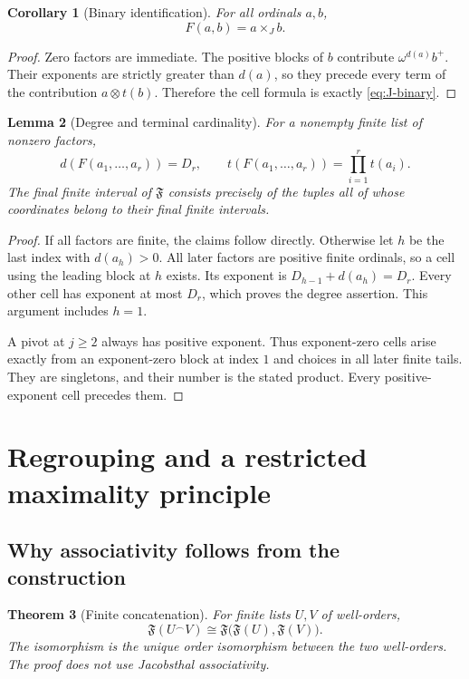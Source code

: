 \documentclass[11pt,letterpaper]{article}
\newtheorem{theorem}{Theorem}[section]
\newtheorem{lemma}[theorem]{Lemma}
\newtheorem{corollary}[theorem]{Corollary}
\theoremstyle{definition}
\theoremstyle{remark}
\newcommand{\J}{\mathbin{\times_{\!J}}}
\newcommand{\FF}{\mathfrak F}
\newcommand{\concat}{\mathbin{{}^{\frown}}}
\begin{document}
\begin{corollary}[Binary identification]\label{cor:F-binary}
For all ordinals $a,b$,
\[
 F(a,b)=a\J b.
\]
\end{corollary}

\begin{proof}
Zero factors are immediate. The positive blocks of $b$ contribute
$\omega^{d(a)}b^+$. Their exponents are strictly greater than $d(a)$, so
they precede every term of the contribution $a\otimes t(b)$. Therefore
the cell formula is exactly \eqref{eq:J-binary}.
\end{proof}

\begin{lemma}[Degree and terminal cardinality]\label{lem:metadata}
For a nonempty finite list of nonzero factors,
\begin{equation}\label{eq:metadata}
 d(F(a_1,\ldots,a_r))=D_r,
 \qquad t(F(a_1,\ldots,a_r))=\prod_{i=1}^{r}t(a_i).
\end{equation}
The final finite interval of $\FF$ consists precisely of the tuples all
of whose coordinates belong to their final finite intervals.
\end{lemma}

\begin{proof}
If all factors are finite, the claims follow directly. Otherwise let $h$
be the last index with $d(a_h)>0$. All later factors are positive finite
ordinals, so a cell using the leading block at $h$ exists. Its exponent
is $D_{h-1}+d(a_h)=D_r$. Every other cell has exponent at most $D_r$,
which proves the degree assertion. This argument includes $h=1$.

A pivot at $j\geq2$ always has positive exponent. Thus exponent-zero cells
arise exactly from an exponent-zero block at index $1$ and choices in all
later finite tails. They are singletons, and their number is the stated
product. Every positive-exponent cell precedes them.
\end{proof}

\section{Regrouping and a restricted maximality principle}\label{sec:grouping}

\subsection{Why associativity follows from the construction}

\begin{theorem}[Finite concatenation]\label{thm:grouping}
For finite lists $U,V$ of well-orders,
\begin{equation}\label{eq:grouping}
 \FF(U\concat V)\cong\FF\bigl(\FF(U),\FF(V)\bigr).
\end{equation}
The isomorphism is the unique order isomorphism between the two well-orders.
The proof does not use Jacobsthal associativity.
\end{theorem}
\end{document}
